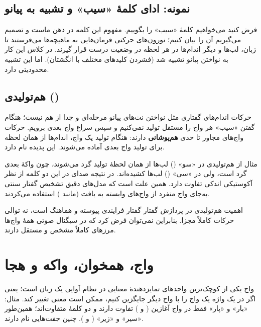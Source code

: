 \subsection{نمونه: ادای کلمهٔ «سیب» و تشبیه به پیانو}
فرض کنید می‌خواهیم کلمهٔ «سیب» را بگوییم. مفهوم این کلمه در ذهن ماست و تصمیم می‌گیریم آن را بیان کنیم؛ نورون‌های حرکتی فرمان‌هایی به ماهیچه‌ها می‌فرستند تا زبان، لب‌ها و دیگر اندام‌ها در هر لحظه در وضعیت درست قرار گیرند. در کلاس این کار به نواختن پیانو تشبیه شد (فشردن کلیدهای مختلف با انگشتان). اما این تشبیه محدودیتی دارد.

\subsection{هم‌تولیدی ()}
حرکات اندام‌های گفتاری مثل نواختن نت‌های پیانو مرحله‌ای و جدا از هم نیست؛ هنگام گفتن «سیب» هر واج را مستقل تولید نمی‌کنیم و سپس سراغ واج بعدی برویم. حرکات واج‌های مجاور تا حدی \textbf{هم‌پوشانی} دارند: هنگام تولید یک واج، اندام‌ها از همان لحظه برای تولید واج بعدی آماده می‌شوند. این پدیده  نام دارد.

\begin{addedbox}{مثال از هم‌تولیدی}
در «سو» () لب‌ها از همان لحظهٔ تولید  گرد می‌شوند، چون واکهٔ بعدی گرد است، ولی در «سی» () لب‌ها کشیده‌اند. در نتیجه صدای  در این دو کلمه از نظر آکوستیکی اندکی تفاوت دارد. همین علت است که مدل‌های دقیق تشخیص گفتار سنتی به‌جای واج منفرد از واج‌های وابسته به بافت (مانند ) استفاده می‌کردند.
\end{addedbox}

\begin{exambox}{اهمیت هم‌تولیدی در پردازش گفتار}
گفتار فرایندی پیوسته و هماهنگ است، نه توالی حرکات کاملاً مجزا. بنابراین نمی‌توان فرض کرد که در سیگنال صوتی همهٔ واج‌ها مرزهای کاملاً مشخص و مستقل دارند.
\end{exambox}

\section{واج، همخوان، واکه و هجا}

\begin{definitionbox}{واج}
 یکی از کوچک‌ترین واحدهای تمایزدهندهٔ معنایی در نظام آوایی یک زبان است؛ یعنی اگر در یک واژه یک واج را با واج دیگر جایگزین کنیم، ممکن است معنی تغییر کند. مثال: «بار» و «پار» فقط در واج آغازین ( و ) تفاوت دارند و دو کلمهٔ متفاوت‌اند؛ همین‌طور «سیر» و «زیر» ( و ). چنین جفت‌هایی  نام دارند.
\end{definitionbox}

